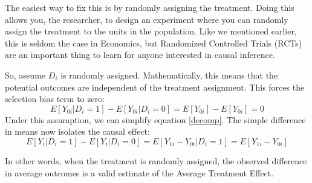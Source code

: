 \documentclass[12pt]{article}
\begin{document}
The easiest way to fix this is by randomly assigning the treatment. Doing this allows
you, the researcher, to design an experiment where you can randomly assign the
treatment to the units in the population. Like we mentioned earlier, this is seldom the
case in Economics, but Randomized Controlled Trials (RCTs) are an important thing to
learn for anyone interested in causal inference.

So, assume $D_i$ is randomly assigned. Mathematically, this means that the potential
outcomes are independent of the treatment assignment. This forces the selection bias
term to zero:
\[
E[Y_{0i} | D_i = 1] - E[Y_{0i} | D_i = 0] = E[Y_{0i}] - E[Y_{0i}] = 0
\]
Under this assumption, we can simplify equation \eqref{decomp}. The simple difference
in means now isolates the causal effect:
\begin{equation}
    E[Y_i | D_i = 1] - E[Y_i | D_i = 0] = E[Y_{1i} - Y_{0i} | D_i = 1] = E[Y_{1i} -
    Y_{0i}]
\end{equation}

In other words, when the treatment is randomly assigned, the observed difference in
average outcomes is a valid estimate of the Average Treatment Effect.

\end{document}
